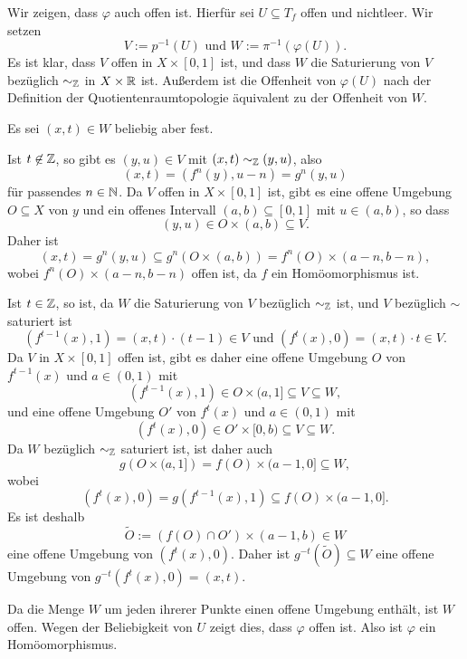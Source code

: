 \documentclass[a4paper,10pt]{article}
\begin{document}
Wir zeigen, dass $\varphi$ auch offen ist. Hierfür sei $U \subseteq T_f$ offen und nichtleer. Wir setzen
\[
 V := p^{-1}(U) \text{ und }
 W := \pi^{-1}(\varphi(U)).
\]
Es ist klar, dass $V$ offen in $X \times [0,1]$ ist, und dass $W$ die Saturierung von $V$ bezüglich $\sim_{\mathbb{Z}}$ in $X \times \mathbb{R}$ ist. Außerdem ist die Offenheit von $\varphi(U)$ nach der Definition der Quotientenraumtopologie äquivalent zu der Offenheit von $W$.

Es sei $(x,t) \in W$ beliebig aber fest.

Ist $t \not\in \mathbb{Z}$, so gibt es $(y,u) \in V$ mit $(x,t) \sim_{\mathbb{Z}} (y,u)$, also
\[
 (x,t) = (f^n(y),u-n) = g^n(y,u)
\]
für passendes $n \in \mathbb{N}$. Da $V$ offen in $X \times [0,1]$ ist, gibt es eine offene Umgebung $O \subseteq X$ von $y$ und ein offenes Intervall $(a,b) \subseteq [0,1]$ mit $u \in (a,b)$, so dass
\[
 (y,u) \in O \times (a,b) \subseteq V.
\]
Daher ist
\[
 (x,t) = g^n(y,u) \subseteq g^n(O \times (a,b)) = f^n(O) \times (a-n,b-n),
\]
wobei $f^n(O) \times (a-n,b-n)$ offen ist, da $f$ ein Homöomorphismus ist.

Ist $t \in \mathbb{Z}$, so ist, da $W$ die Saturierung von $V$ bezüglich $\sim_{\mathbb{Z}}$ ist, und $V$ bezüglich $\sim$ saturiert ist
\[
 \left( f^{t-1}(x) , 1 \right) = (x,t) \cdot (t-1) \in V \text{ und }
 \left( f^{t}(x) , 0 \right) = (x,t) \cdot t \in V.
\]
Da $V$ in $X \times [0,1]$ offen ist, gibt es daher eine offene Umgebung $O$ von $f^{t-1}(x)$ und $a \in (0,1)$ mit
\[
 \left( f^{t-1}(x), 1 \right) \in O \times (a,1] \subseteq V \subseteq W,
\]
und eine offene Umgebung $O'$ von $f^{t}(x)$ und $a \in (0,1)$ mit
\[
 \left( f^{t}(x), 0 \right) \in O' \times [0,b) \subseteq V \subseteq W.
\]
Da $W$ bezüglich $\sim_{\mathbb{Z}}$ saturiert ist, ist daher auch
\[
 g\left( O \times (a,1] \right) = f(O) \times (a-1,0] \subseteq W,
\]
wobei
\[
 \left( f^{t}(x), 0 \right) = g\left( f^{t-1}(x), 1 \right) \subseteq f(O) \times (a-1,0].
\]
Es ist deshalb
\[
 \tilde{O} := (f(O) \cap O') \times (a-1,b) \in W
\]
eine offene Umgebung von $\left( f^{t}(x), 0 \right)$. Daher ist $g^{-t}(\tilde{O}) \subseteq W$ eine offene Umgebung von $g^{-t}(f^t(x),0) = (x,t)$.

Da die Menge $W$ um jeden ihrerer Punkte einen offene Umgebung enthält, ist $W$ offen. Wegen der Beliebigkeit von $U$ zeigt dies, dass $\varphi$ offen ist. Also ist $\varphi$ ein Homöomorphismus.





\section{}
\end{document}
